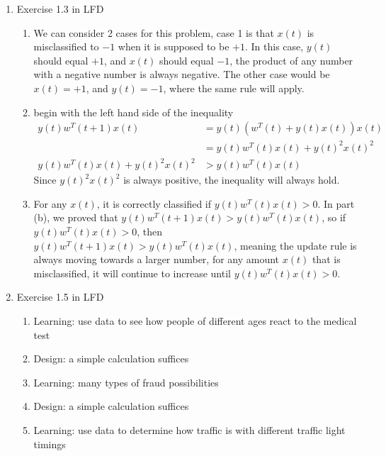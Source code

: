 \documentclass{article}
\begin{document}
    \begin{enumerate}
        \item Exercise 1.3 in LFD
        \begin{enumerate}[label=(\alph*)]
            \item We can consider 2 cases for this problem, case 1 is that $x(t)$ is misclassified to $-1$ when it is supposed to be $+1$. In this case, $y(t)$ should equal $+1$, and $x(t)$ should equal $-1$, the product of any number with a negative number is always negative. The other case would be $x(t) = +1$, and $y(t) = -1$, where the same rule will apply.
            \item begin with the left hand side of the inequality
            \begin{align*}
                y(t)w^T(t+1)x(t) &= y(t)(w^T(t) + y(t)x(t))x(t)\\
                &= y(t)w^T(t)x(t) + y(t)^2x(t)^2\\
                y(t)w^T(t)x(t) + y(t)^2x(t)^2 & > y(t)w^T(t)x(t)
            \end{align*}
            Since $y(t)^2x(t)^2$ is always positive, the inequality will always hold.
            \item For any $x(t)$, it is correctly classified if $y(t)w^T(t)x(t) > 0$. In part (b), we proved that $y(t)w^T(t+1)x(t) > y(t)w^T(t)x(t)$, so if $y(t)w^T(t)x(t) > 0$, then $y(t)w^T(t+1)x(t) > y(t)w^T(t)x(t)$, meaning the update rule is always moving towards a larger number, for any amount $x(t)$ that is misclassified, it will continue to increase until $y(t)w^T(t)x(t) > 0$. 
        \end{enumerate}

        \item Exercise 1.5 in LFD
        \begin{enumerate}[label=(\alph*)]
            \item Learning: use data to see how people of different ages react to the medical test
            \item Design: a simple calculation suffices
            \item Learning: many types of fraud possibilities
            \item Design: a simple calculation suffices
            \item Learning: use data to determine how traffic is with different traffic light timings
        \end{enumerate}


\end{enumerate}
\end{document}
